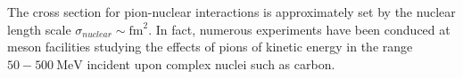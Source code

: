 \documentclass[11 pt, preprint,preprintnumbers,amsmath,amssymb, prd]{revtex4}
\begin{document}
The cross section for pion-nuclear interactions is approximately set by the nuclear length scale $\sigma_{nuclear} \sim \text{fm}^2$. In fact, numerous experiments have been conduced at meson facilities studying the effects of pions of kinetic energy in the range $50 - 500 ~\text{MeV}$ incident upon complex nuclei such as carbon. 
\end{document}
